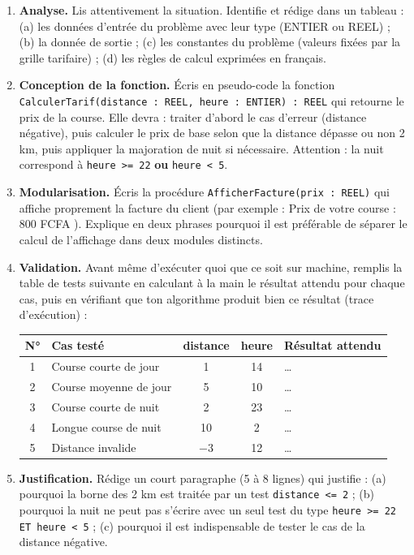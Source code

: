 \documentclass[11pt]{article}
\newcommand{\cle}[1]{{\popxbold\color{popdark}#1}}
\begin{document}
\begin{enumerate}
\item \textbf{Analyse.} Lis attentivement la situation. Identifie et rédige dans un tableau : (a) les \cle{données d'entrée} du problème avec leur type (ENTIER ou REEL) ; (b) la \cle{donnée de sortie} ; (c) les \cle{constantes} du problème (valeurs fixées par la grille tarifaire) ; (d) les \cle{règles de calcul} exprimées en français.
\item \textbf{Conception de la fonction.} Écris en pseudo-code la fonction \texttt{CalculerTarif(distance : REEL, heure : ENTIER) : REEL} qui retourne le prix de la course. Elle devra : traiter d'abord le cas d'erreur (distance négative), puis calculer le prix de base selon que la distance dépasse ou non \num{2} km, puis appliquer la majoration de nuit si nécessaire. Attention : la nuit correspond à \texttt{heure >= 22} \textbf{ou} \texttt{heure < 5}.
\item \textbf{Modularisation.} Écris la procédure \texttt{AfficherFacture(prix : REEL)} qui affiche proprement la facture du client (par exemple : \og Prix de votre course : 800 FCFA \fg). Explique en deux phrases pourquoi il est préférable de séparer le calcul de l'affichage dans deux modules distincts.
\item \textbf{Validation.} Avant même d'exécuter quoi que ce soit sur machine, remplis la \cle{table de tests} suivante en calculant à la main le résultat attendu pour chaque cas, puis en vérifiant que ton algorithme produit bien ce résultat (trace d'exécution) :

\begin{center}
\begin{tabularx}{\linewidth}{|c|l|c|c|X|}
\hline
\rowcolor{popblueL}
\textbf{N°} & \textbf{Cas testé} & \textbf{distance} & \textbf{heure} & \textbf{Résultat attendu} \\
\hline
1 & Course courte de jour & \num{1} & \num{14} & \ldots \\
\hline
2 & Course moyenne de jour & \num{5} & \num{10} & \ldots \\
\hline
3 & Course courte de nuit & \num{2} & \num{23} & \ldots \\
\hline
4 & Longue course de nuit & \num{10} & \num{2} & \ldots \\
\hline
5 & Distance invalide & \num{-3} & \num{12} & \ldots \\
\hline
\end{tabularx}
\end{center}

\item \textbf{Justification.} Rédige un court paragraphe (5 à 8 lignes) qui justifie : (a) pourquoi la borne des \num{2} km est traitée par un test \texttt{distance <= 2} ; (b) pourquoi la nuit ne peut pas s'écrire avec un seul test du type \texttt{heure >= 22 ET heure < 5} ; (c) pourquoi il est indispensable de tester le cas de la distance négative.
\end{enumerate}
\end{document}
